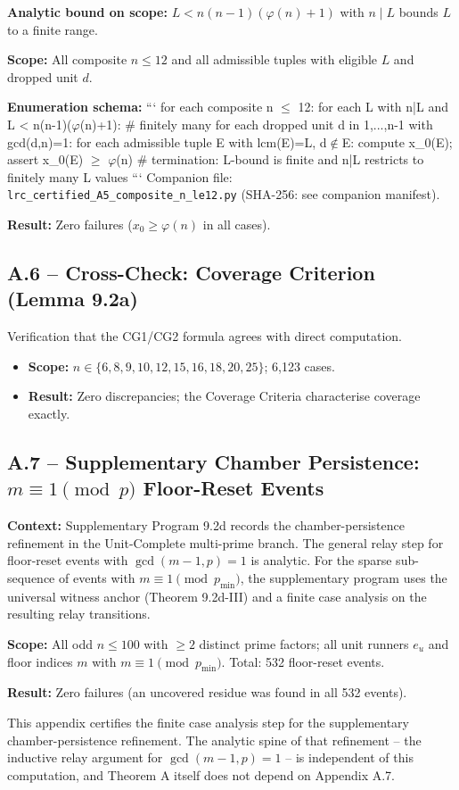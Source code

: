 \documentclass[11pt,a4paper]{article}
\theoremstyle{plain}
\theoremstyle{definition}
\theoremstyle{remark}
\begin{document}
\textbf{Analytic bound on scope:} $L < n(n-1)(\varphi(n)+1)$ with $n \mid L$ bounds $L$ to a finite range.

\textbf{Scope:} All composite $n \leq 12$ and all admissible tuples with eligible $L$ and dropped unit $d$.

\textbf{Enumeration schema:}
```
for each composite n $\leq$ 12:
  for each L with n|L and L < n(n-1)($\varphi$(n)+1):   \# finitely many
    for each dropped unit d in {1,...,n-1} with gcd(d,n)=1:
      for each admissible tuple E with lcm(E)=L, d$\notin$E:
        compute x\_0(E); assert x\_0(E) $\geq$ $\varphi$(n)
  \# termination: L-bound is finite and n|L restricts to finitely many L values
```
Companion file: \texttt{lrc\_certified\_A5\_composite\_n\_le12.py} (SHA-256: see companion manifest).

\textbf{Result:} Zero failures ($x_0 \geq \varphi(n)$ in all cases).


\subsection{A.6 -- Cross-Check: Coverage Criterion (Lemma 9.2a)}


Verification that the CG1/CG2 formula agrees with direct computation.

\begin{itemize}
\item \textbf{Scope:} $n \in \{6,8,9,10,12,15,16,18,20,25\}$; 6,123 cases.
\item \textbf{Result:} Zero discrepancies; the Coverage Criteria characterise coverage exactly.
\end{itemize}


\subsection{A.7 -- Supplementary Chamber Persistence: $m \equiv 1 \pmod{p}$ Floor-Reset Events}


\textbf{Context:} Supplementary Program 9.2d records the chamber-persistence refinement in the Unit-Complete multi-prime branch. The general relay step for floor-reset events with $\gcd(m-1, p) = 1$ is analytic. For the sparse sub-sequence of events with $m \equiv 1 \pmod{p_{\min}}$, the supplementary program uses the universal witness anchor (Theorem 9.2d-III) and a finite case analysis on the resulting relay transitions.

\textbf{Scope:} All odd $n \leq 100$ with $\geq 2$ distinct prime factors; all unit runners $e_u$ and floor indices $m$ with $m \equiv 1 \pmod{p_{\min}}$. Total: 532 floor-reset events.

\textbf{Result:} Zero failures (an uncovered residue was found in all 532 events).

This appendix certifies the finite case analysis step for the supplementary chamber-persistence refinement. The analytic spine of that refinement -- the inductive relay argument for $\gcd(m-1,p) = 1$ -- is independent of this computation, and Theorem A itself does not depend on Appendix A.7.
\end{document}
